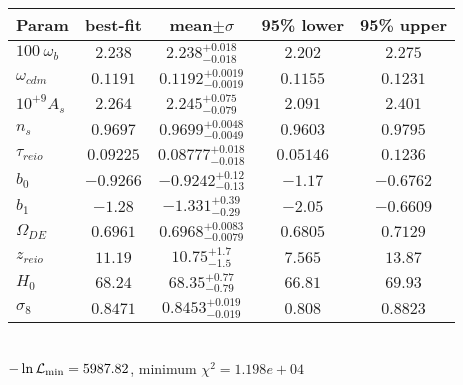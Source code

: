 \begin{tabular}{|l|c|c|c|c|} 
 \hline 
Param & best-fit & mean$\pm\sigma$ & 95\% lower & 95\% upper \\ \hline 
$100~\omega_{b }$ &$2.238$ & $2.238_{-0.018}^{+0.018}$ & $2.202$ & $2.275$ \\ 
$\omega_{cdm }$ &$0.1191$ & $0.1192_{-0.0019}^{+0.0019}$ & $0.1155$ & $0.1231$ \\ 
$10^{+9}A_{s }$ &$2.264$ & $2.245_{-0.079}^{+0.075}$ & $2.091$ & $2.401$ \\ 
$n_{s }$ &$0.9697$ & $0.9699_{-0.0049}^{+0.0048}$ & $0.9603$ & $0.9795$ \\ 
$\tau_{reio }$ &$0.09225$ & $0.08777_{-0.018}^{+0.018}$ & $0.05146$ & $0.1236$ \\ 
$b_{0 }$ &$-0.9266$ & $-0.9242_{-0.13}^{+0.12}$ & $-1.17$ & $-0.6762$ \\ 
$b_{1 }$ &$-1.28$ & $-1.331_{-0.29}^{+0.39}$ & $-2.05$ & $-0.6609$ \\ 
$\Omega_{DE}$ &$0.6961$ & $0.6968_{-0.0079}^{+0.0083}$ & $0.6805$ & $0.7129$ \\ 
$z_{reio }$ &$11.19$ & $10.75_{-1.5}^{+1.7}$ & $7.565$ & $13.87$ \\ 
$H_{0 }$ &$68.24$ & $68.35_{-0.79}^{+0.77}$ & $66.81$ & $69.93$ \\ 
$\sigma_8$ &$0.8471$ & $0.8453_{-0.019}^{+0.019}$ & $0.808$ & $0.8823$ \\ 
\hline 
 \end{tabular} \\ 
$-\ln{\cal L}_\mathrm{min} =5987.82$, minimum $\chi^2=1.198e+04$ \\ 
